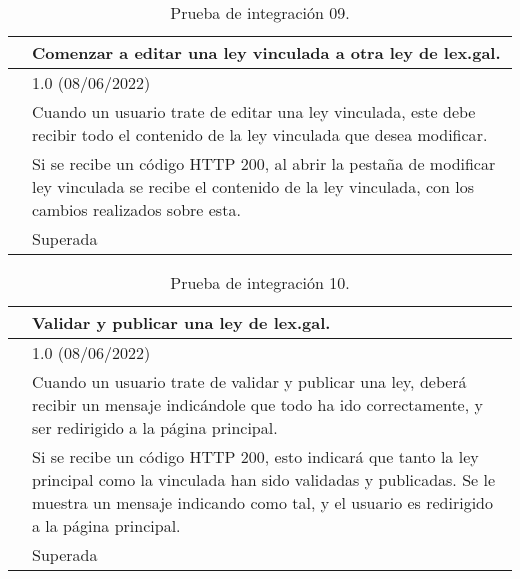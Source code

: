 \begin{table}[H]
\begin{center}
\begin{tabular}{|p{3cm}|p{10cm}|} \hline
\centering {\bf PI-09} & Comenzar a editar una ley vinculada a otra ley de lex.gal.  \\ \hline\hline
\centering {\bf Versión} & 1.0 (08/06/2022) \\ \hline
\centering {\bf Descripción} & Cuando un usuario trate de editar una ley vinculada, este debe recibir todo el contenido de la ley vinculada que desea modificar. \\ \hline
\centering {\bf Criterio de aceptación} & Si se recibe un código HTTP 200, al abrir la pestaña de modificar ley vinculada se recibe el contenido de la ley vinculada, con los cambios realizados sobre esta. \\ \hline
\centering {\bf Estado} & Superada \\ \hline
\end{tabular}
\caption{Prueba de integración 09.}
\label{enlacePI9}
\end{center}
\end{table}

\begin{table}[H]
\begin{center}
\begin{tabular}{|p{3cm}|p{10cm}|} \hline
\centering {\bf PI-10} & Validar y publicar una ley de lex.gal.  \\ \hline\hline
\centering {\bf Versión} & 1.0 (08/06/2022) \\ \hline
\centering {\bf Descripción} & Cuando un usuario trate de validar y publicar una ley, deberá recibir un mensaje indicándole que todo ha ido correctamente, y ser redirigido a la página principal. \\ \hline
\centering {\bf Criterio de aceptación} & Si se recibe un código HTTP 200, esto indicará que tanto la ley principal como la vinculada han sido validadas y publicadas. Se le muestra un mensaje indicando como tal, y el usuario es redirigido a la página principal. \\ \hline
\centering {\bf Estado} & Superada \\ \hline
\end{tabular}
\caption{Prueba de integración 10.}
\label{enlacePI10}
\end{center}
\end{table}

